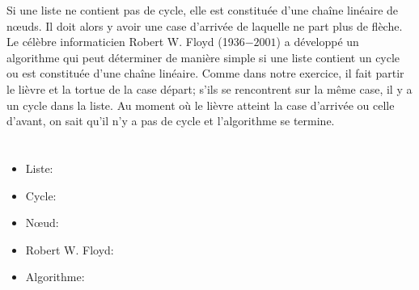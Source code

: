 {{{\centering%
\par}

{\centering%
\par}

Si une liste ne contient pas de cycle, elle est constituée d’une chaîne linéaire de nœuds. Il doit alors y avoir une case d’arrivée de laquelle ne part plus de flèche. Le célèbre informaticien Robert W. Floyd (1936$-2001$) a développé un algorithme qui peut déterminer de manière simple si une liste contient un cycle ou est constituée d’une chaîne linéaire. Comme dans notre exercice, il fait partir le lièvre et la tortue de la case départ; s’ils se rencontrent sur la même case, il y a un cycle dans la liste. Au moment où le lièvre atteint la case d’arrivée ou celle d’avant, on sait qu’il n’y a pas de cycle et l’algorithme se termine.



\section*{\BrochureWebsitesAndKeywords}
{\raggedright
\begin{itemize}
  \item Liste: \href{https://fr.wikipedia.org/wiki/Liste_cha\%C3\%AEn\%C3\%A9e}{}
  \item Cycle: \href{https://fr.wikipedia.org/wiki/Cycle_(th\%C3\%A9orie_des_graphes)}{}
  \item Nœud: \href{https://fr.wikipedia.org/wiki/Sommet_(th\%C3\%A9orie_des_graphes)}{}
  \item Robert W. Floyd: \href{https://fr.wikipedia.org/wiki/Robert_Floyd}{}
  \item Algorithme: \href{https://fr.wikipedia.org/wiki/Algorithme}{}
\end{itemize}


}

}{}

}
